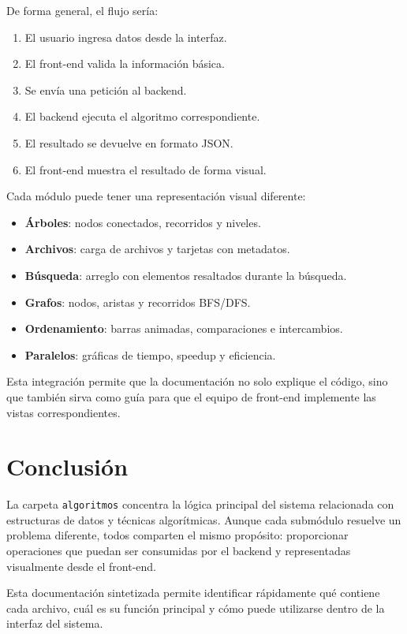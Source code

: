 \documentclass[12pt]{article}
\begin{document}
	De forma general, el flujo sería:
	
	\begin{enumerate}
		\item El usuario ingresa datos desde la interfaz.
		\item El front-end valida la información básica.
		\item Se envía una petición al backend.
		\item El backend ejecuta el algoritmo correspondiente.
		\item El resultado se devuelve en formato JSON.
		\item El front-end muestra el resultado de forma visual.
	\end{enumerate}
	
	Cada módulo puede tener una representación visual diferente:
	
	\begin{itemize}
		\item \textbf{Árboles}: nodos conectados, recorridos y niveles.
		\item \textbf{Archivos}: carga de archivos y tarjetas con metadatos.
		\item \textbf{Búsqueda}: arreglo con elementos resaltados durante la búsqueda.
		\item \textbf{Grafos}: nodos, aristas y recorridos BFS/DFS.
		\item \textbf{Ordenamiento}: barras animadas, comparaciones e intercambios.
		\item \textbf{Paralelos}: gráficas de tiempo, speedup y eficiencia.
	\end{itemize}
	
	Esta integración permite que la documentación no solo explique el código, sino que también sirva como guía para que el equipo de front-end implemente las vistas correspondientes.
	
	\section{Conclusión}
	
	La carpeta \texttt{algoritmos} concentra la lógica principal del sistema relacionada con estructuras de datos y técnicas algorítmicas. Aunque cada submódulo resuelve un problema diferente, todos comparten el mismo propósito: proporcionar operaciones que puedan ser consumidas por el backend y representadas visualmente desde el front-end.
	
	Esta documentación sintetizada permite identificar rápidamente qué contiene cada archivo, cuál es su función principal y cómo puede utilizarse dentro de la interfaz del sistema.
	
\end{document}
